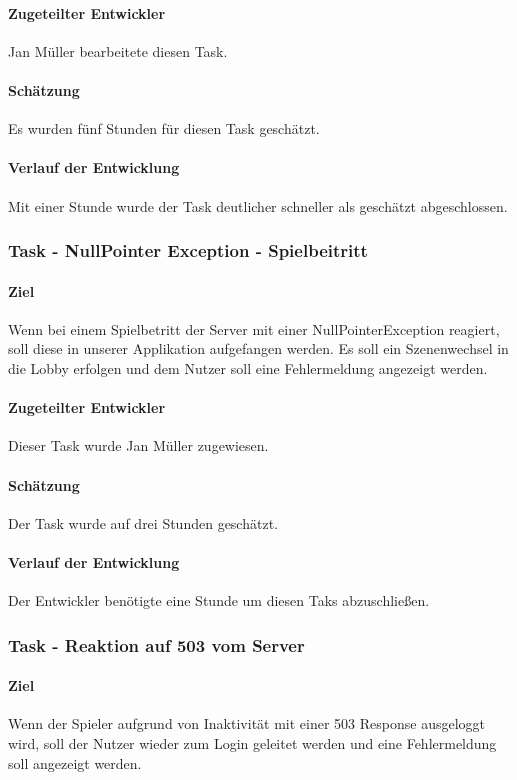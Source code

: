 \documentclass[12pt, titlepage]{scrartcl}
\begin{document}
			\paragraph{Zugeteilter Entwickler} Jan Müller bearbeitete diesen Task.
			\paragraph{Schätzung}
			Es wurden fünf Stunden für diesen Task geschätzt.
			\paragraph{Verlauf der Entwicklung} Mit einer Stunde wurde der Task deutlicher schneller als geschätzt abgeschlossen.
			\subsubsection{Task - NullPointer Exception - Spielbeitritt}
			\paragraph{Ziel} Wenn bei einem Spielbetritt der Server mit einer NullPointerException reagiert, soll diese in unserer Applikation aufgefangen werden. Es soll ein Szenenwechsel in die Lobby erfolgen und dem Nutzer soll eine Fehlermeldung angezeigt werden.
			\paragraph{Zugeteilter Entwickler} Dieser Task wurde Jan Müller zugewiesen.
			\paragraph{Schätzung} Der Task wurde auf drei Stunden geschätzt.
			\paragraph{Verlauf der Entwicklung} Der Entwickler benötigte eine Stunde um diesen Taks abzuschließen.
			\subsubsection{Task - Reaktion auf 503 vom Server}
			\paragraph{Ziel} Wenn der Spieler aufgrund von Inaktivität mit einer 503 Response ausgeloggt wird, soll der Nutzer wieder zum Login geleitet werden und eine Fehlermeldung soll angezeigt werden.
\end{document}
